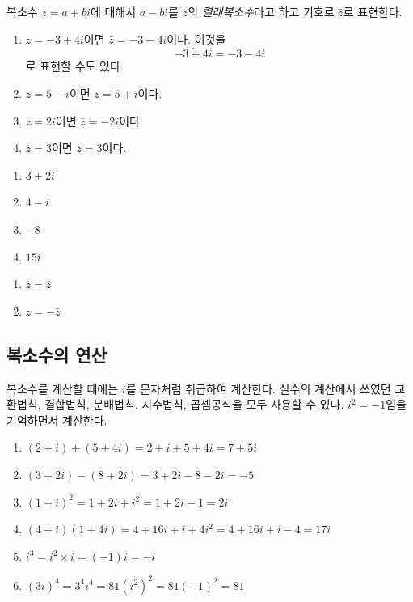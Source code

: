 \documentclass{oblivoir}
\begin{document}
\clearpage
%
\begin{mdframed}
복소수 \(z=a+bi\)에 대해서 \(a-bi\)를 \(z\)의 \emph{켤레복소수}라고 하고 기호로 \(\bar z\)로 표현한다.
\end{mdframed}

%
\exam{}
\begin{enumerate}
\item
\(z=-3+4i\)이면 \(\bar z=-3-4i\)이다.
이것을
\[\overline{-3+4i}=-3-4i\]
로 표현할 수도 있다.
\item
\(z=5-i\)이면 \(\bar z=5+i\)이다.
\item
\(z=2i\)이면 \(\bar z=-2i\)이다.
\item
\(z=3\)이면 \(\bar z=3\)이다.
\end{enumerate}

%
\begin{enumerate}\label{comp6}
\item
\(3+2i\)
\item
\(4-i\)
\item
\(-8\)
\item
\(15i\)
\end{enumerate}

%
\begin{enumerate}\label{comp7}
\item
\(z=\bar z\)
\item
\(z=-\bar z\)
\end{enumerate}

\clearpage
\subsection{복소수의 연산}
복소수를 계산할 때에는 \(i\)를 문자처럼 취급하여 계산한다.
실수의 계산에서 쓰였던 교환법칙, 결합법칙, 분배법칙. 지수법칙, 곱셈공식을 모두 사용할 수 있다.
\(i^2=-1\)임을 기억하면서 계산한다.

%
\exam{}
\begin{enumerate}
\item
\((2+i)+(5+4i)=2+i+5+4i=7+5i\)
\item
\((3+2i)-(8+2i)=3+2i-8-2i=-5\)
\item
\((1+i)^2=1+2i+i^2=1+2i-1=2i\)
\item
\((4+i)(1+4i)=4+16i+i+4i^2=4+16i+i-4=17i\)
\item
\(i^3=i^2\times i=(-1)i=-i\)
\item
\((3i)^4=3^4i^4=81(i^2)^2=81(-1)^2=81\)
\end{enumerate}
\end{document}
